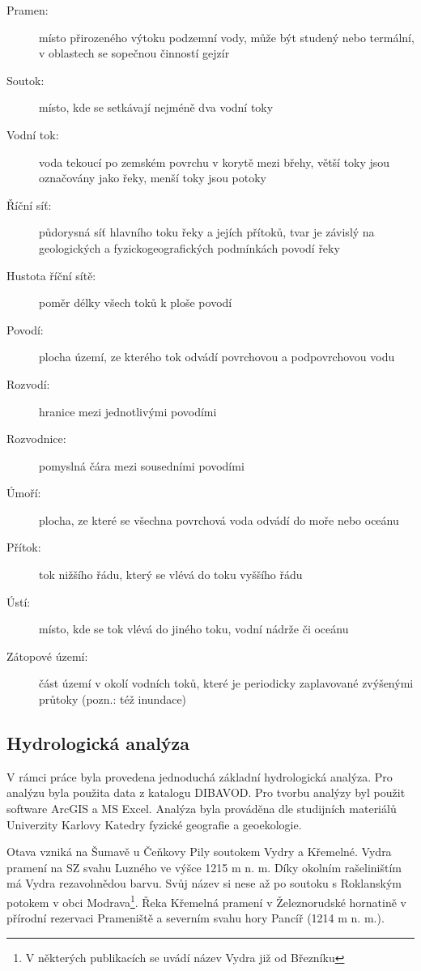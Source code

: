 \documentclass[thesis=M,czech]{FITthesis}[2012/06/26]
\begin{document}
\begin{description}
\item[Pramen:] místo přirozeného výtoku podzemní vody, může být studený nebo termální, v oblastech se sopečnou činností gejzír
\item[Soutok:] místo, kde se setkávají nejméně dva vodní toky
\item[Vodní tok:] voda tekoucí po zemském povrchu v korytě mezi břehy, větší toky jsou označovány jako řeky, menší toky jsou potoky
\item[Říční síť:] půdorysná síť hlavního toku řeky a jejích přítoků, tvar je závislý na geologických a fyzickogeografických podmínkách povodí řeky
\item[Hustota říční sítě:] poměr délky všech toků k ploše povodí
\item[Povodí:] plocha území, ze kterého tok odvádí povrchovou a podpovrchovou vodu
\item[Rozvodí:] hranice mezi jednotlivými povodími
\item[Rozvodnice:] pomyslná čára mezi sousedními povodími
\item[Úmoří:] plocha, ze které se všechna povrchová voda odvádí do moře nebo oceánu
\item[Přítok:] tok nižšího řádu, který se vlévá do toku vyššího řádu
\item[Ústí:] místo, kde se tok vlévá do jiného toku, vodní nádrže či oceánu
\item[Zátopové území:] část území v okolí vodních toků, které je periodicky zaplavované zvýšenými průtoky (pozn.: též inundace)
\end{description}



\subsection{Hydrologická analýza}
V rámci práce byla provedena jednoduchá základní hydrologická analýza. Pro analýzu byla použita data z katalogu DIBAVOD. Pro tvorbu analýzy byl použit software ArcGIS a MS Excel. Analýza byla prováděna dle studijních materiálů Univerzity Karlovy Katedry fyzické geografie a geoekologie. \cite{UK}

Otava vzniká na Šumavě u Čeňkovy Pily soutokem Vydry a Křemelné. Vydra pramení na SZ svahu Luzného ve výšce 1215 m n. m. Díky okolním rašeliništím má Vydra rezavohnědou barvu. Svůj název si nese až po soutoku s Roklanským potokem v obci Modrava\footnote{V některých publikacích se uvádí název Vydra již od Březníku}. Řeka Křemelná pramení v Železnorudské hornatině v přírodní rezervaci Prameniště a severním svahu hory Pancíř (1214 m n. m.). \cite{SMOOS}
\end{document}
